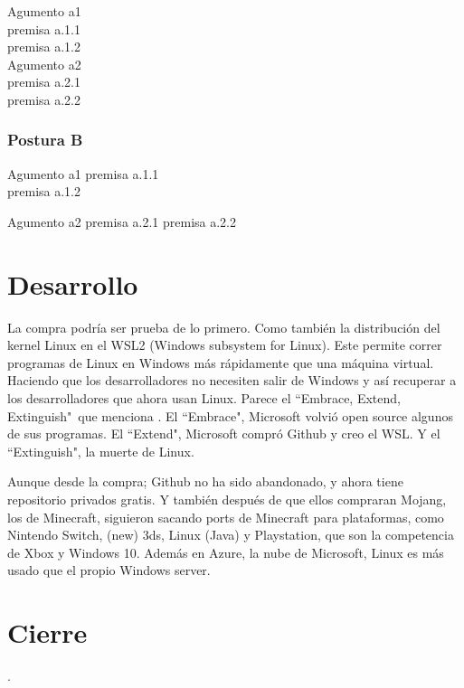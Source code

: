 \documentclass[12pt, twoside]{article}
\begin{document}
Agumento a1\\
premisa a.1.1\\
premisa a.1.2\\
Agumento a2\\
premisa a.2.1\\
premisa a.2.2

\subsubsection{Postura B}%

Agumento a1
premisa a.1.1\\
premisa a.1.2

Agumento a2
premisa a.2.1
premisa a.2.2
\fi
\section{Desarrollo}%
\label{sec:Desarrollo}

La compra podría ser prueba de lo primero.
Como también la distribución del kernel Linux en el WSL2 (Windows subsystem for Linux). \citet{WSL2}
Este permite correr programas de Linux en Windows más rápidamente que una máquina virtual.
Haciendo que los desarrolladores no necesiten salir de Windows y así recuperar a los desarrolladores que ahora usan Linux. \citet{STACK}
Parece el ``Embrace, Extend, Extinguish"\ que menciona \citet{WSL2}.
El ``Embrace", Microsoft volvió open source algunos de sus programas.
El ``Extend", Microsoft compró Github y creo el WSL.
Y el ``Extinguish", la muerte de Linux.

Aunque desde la compra; Github no ha sido abandonado, y ahora tiene repositorio privados gratis.
Y también después de que ellos compraran Mojang, los de Minecraft, siguieron sacando ports de Minecraft para plataformas,
como Nintendo Switch, (new) 3ds, Linux (Java) y Playstation, que son la competencia de Xbox y Windows 10.
Además en Azure, la nube de Microsoft, Linux es más usado que el propio Windows server. \citet{AZURE}

\section{Cierre}%
\label{sec:Cierre}

\newpage
.
\vfill
\nocite{*}
\printbibliography
\end{document}
